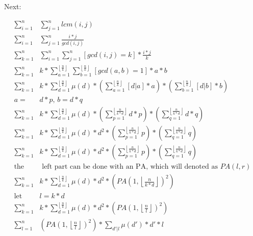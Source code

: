     Next:

    \begin{align*}
        \sum_{i=1}^{n}& \sum_{j=1}^{n} lcm(i,j) \\
        \sum_{i=1}^{n}& \sum_{j=1}^{n} \frac{i*j}{gcd(i,j)} \\
        \sum_{k=1}^{n}& \sum_{i=1}^{n} \sum_{j=1}^{n} [gcd(i,j) = k]*\frac{i*j}{k} \\
        \sum_{k=1}^{n}& k * \sum_{a=1}^{\left\lfloor \frac{n}{k} \right\rfloor} 
        \sum_{b=1}^{\left\lfloor \frac{n}{k} \right\rfloor} [gcd(a,b) = 1]*a*b \\
        \sum_{k=1}^{n}& k * \sum_{d = 1}^{\left\lfloor \frac{n}{k} \right\rfloor} \mu(d) * (\sum_{a=1}^{\left\lfloor \frac{n}{k} \right\rfloor}[d|a]*a) * ( 
        \sum_{b=1}^{\left\lfloor \frac{n}{k} \right\rfloor} [d|b]*b) \\
        a =& d*p\text{, }b = d*q\\
        \sum_{k=1}^{n}& k * \sum_{d = 1}^{\left\lfloor \frac{n}{k} \right\rfloor} \mu(d) * (\sum_{p=1}^{\left\lfloor \frac{n}{k*d} \right\rfloor}d*p) * ( 
        \sum_{q=1}^{\left\lfloor \frac{n}{k*d} \right\rfloor} d*q) \\
       \sum_{k=1}^{n}& k * \sum_{d = 1}^{\left\lfloor \frac{n}{k} \right\rfloor} \mu(d) * d^2 * (\sum_{p=1}^{\left\lfloor \frac{n}{k*d} \right\rfloor}p) * ( 
        \sum_{q=1}^{\left\lfloor \frac{n}{k*d} \right\rfloor} q) \\
        \sum_{k=1}^{n}& k * \sum_{d = 1}^{\left\lfloor \frac{n}{k} \right\rfloor} \mu(d) * d^2 * (\sum_{p=1}^{\left\lfloor \frac{n}{k*d} \right\rfloor}p) * ( 
        \sum_{q=1}^{\left\lfloor \frac{n}{k*d} \right\rfloor} q) \\
        \text{the}&\text{ left part can be done with an PA, which will denoted as } PA(l,r)\\
        \sum_{k=1}^{n}& k * \sum_{d = 1}^{\left\lfloor \frac{n}{k} \right\rfloor} \mu(d) * d^2 * (PA(1,\left\lfloor \frac{n}{k*d} \right\rfloor)^2)  \\
        \text{let }& l = k*d\\
         \sum_{k=1}^{n}& k * \sum_{d = 1}^{\left\lfloor \frac{n}{k} \right\rfloor} \mu(d) * d^2 * (PA(1,\left\lfloor \frac{n}{l} \right\rfloor)^2)  \\
         \sum_{l=1}^{n}& (PA(1,\left\lfloor \frac{n}{l} \right\rfloor)^2) * \sum_{d'|l} \mu(d') * d' * l   \\
    \end{align*}


